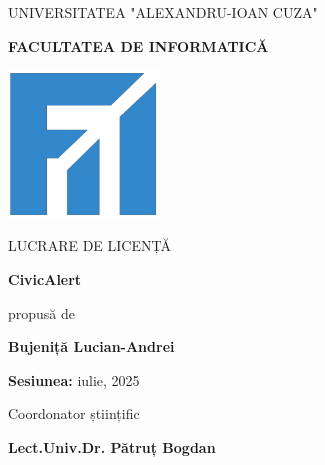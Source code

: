 \documentclass[12pt,a4paper]{report}
\begin{document}
\begin{titlepage}
\thispagestyle{empty}
  \begin{center}
        \large
        \MakeUppercase{Universitatea "Alexandru-Ioan Cuza"}
        
        \LARGE
        \textbf{\MakeUppercase{Facultatea de Informatică}}
        
        \vspace{1cm}
        \includegraphics[width=0.3\textwidth]{logo_uaic.png}
        
        \vspace{1cm}
        \Large
        \MakeUppercase{Lucrare de licență}
        
        \vspace{0.5cm}
        \LARGE
        \textbf{CivicAlert}
        
        \vspace{2cm}
        \Large
        propusă de
        
        \vspace{0.5cm}
        \LARGE
        \textbf{Bujeniță Lucian-Andrei}
        
        \vfill
        \Large
        \textbf{Sesiunea:} iulie, 2025
        
        \vspace{2cm}
        \Large
        Coordonator științific
        
        \vspace{0.5cm}
        \LARGE
        \textbf{Lect.Univ.Dr.  Pătruț Bogdan}
    \end{center}
\end{titlepage}
\end{document}
